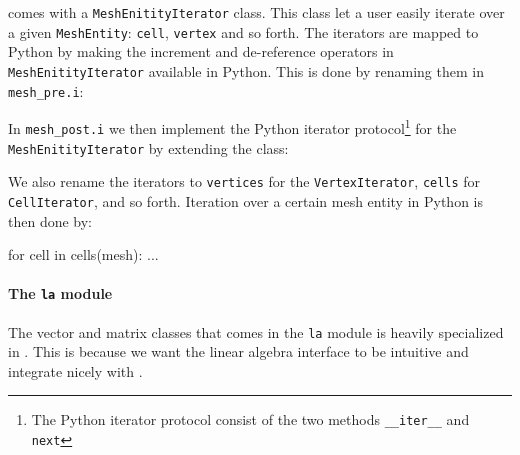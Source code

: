 \dolfin comes with a \texttt{Mesh}\-\texttt{Enitity}\-\texttt{Iterator} class. This class let a user easily iterate over a given \texttt{MeshEntity}: \texttt{cell}, \texttt{vertex} and so forth. The iterators are mapped to Python by making the increment and de-reference operators in \texttt{MeshEnitityIterator} available in Python. This is done by renaming them in \texttt{mesh\_pre.i}:
\begin{c++}
\end{c++}
In \texttt{mesh\_post.i} we then implement the Python iterator protocol\footnote{The Python iterator protocol consist of the two methods \texttt{\_\_iter\_\_} and \texttt{next}} for the \texttt{Mesh}\-\texttt{Enitity}\-\texttt{Iterator} by extending the class:
We also rename the iterators to \texttt{vertices} for the \texttt{VertexIterator}, \texttt{cells} for \texttt{CellIterator}, and so forth. Iteration over a certain mesh entity in Python is then done by:
\begin{python}
for cell in cells(mesh):
    ...
\end{python}

\paragraph{The \texttt{la} module}
The vector and matrix classes that comes in the \texttt{la} module is heavily specialized in \pydolfin. This is because we want the linear algebra interface to be intuitive and integrate nicely with \numpy.\par

